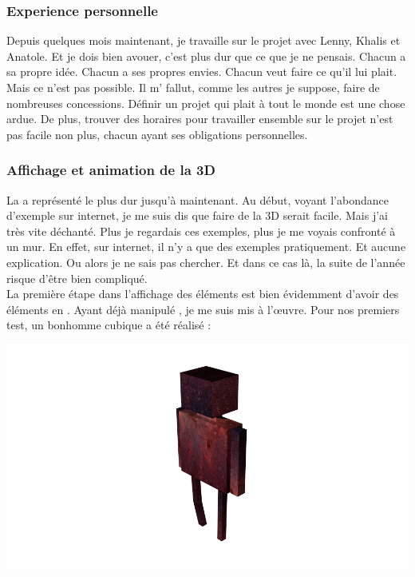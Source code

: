 \documentclass{article}
\begin{document}
\subsubsection{Experience personnelle}

Depuis quelques mois maintenant, je travaille sur le projet avec Lenny, Khalis et Anatole. Et je dois bien avouer, c'est plus dur que ce que je ne pensais. Chacun a sa propre idée. Chacun a ses propres envies. Chacun veut faire ce qu'il lui plait. Mais ce n'est pas possible. Il m' fallut, comme les autres je suppose, faire de nombreuses concessions. Définir un projet qui plait à tout le monde est une chose ardue. De plus, trouver des horaires pour travailler ensemble sur le projet n'est pas facile non plus, chacun ayant ses obligations personnelles.

\subsubsection{Affichage et animation de la 3D}
La  a représenté le plus dur jusqu'à maintenant. Au début, voyant l'abondance d'exemple sur internet, je me suis dis que faire de la 3D serait facile. Mais j'ai très vite déchanté. Plus je regardais ces exemples, plus je me voyais confronté à un mur. En effet, sur internet, il n'y a que des exemples pratiquement. Et aucune explication. Ou alors je ne sais pas chercher. Et dans ce cas là, la suite de l'année risque d'être bien compliqué. \\
La première étape dans l'affichage des éléments  est bien évidemment d'avoir des éléments en . Ayant déjà manipulé , je me suis mis à l'\oe uvre. Pour nos premiers test, un bonhomme cubique a été réalisé : \begin{center}
\includegraphics[scale=01.0]{perso}
\end{center}
\end{document}

